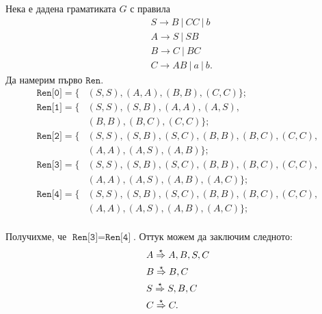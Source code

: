 \begin{extra}
\begin{multicols}{2}
    \begin{example}
      Нека е дадена граматиката $G$ с правила  
      \begin{align*}
        & S \to B\ |\ CC\ |\ b\\
        & A \to S\ |\ SB\\
        & B \to C\ |\ BC\\
        & C \to AB\ |\ a\ |\ b.
      \end{align*}
      Да намерим първо $\texttt{Ren}$.
      \begin{align*}
        \texttt{Ren[0]} = \{ & (S,S), (A,A), (B,B), (C,C)\};\\
        \texttt{Ren[1]} = \{ & (S,S), (S,B), (A,A), (A,S),\\
                             & (B,B), (B,C), (C,C)\};\\
        \texttt{Ren[2]} = \{ & (S,S),(S,B), (S,C), (B,B), (B,C), (C,C),\\
                             & (A,A), (A,S), (A,B)\};\\
        \texttt{Ren[3]} = \{ & (S,S),(S,B), (S,C), (B,B), (B,C), (C,C),\\
                             & (A,A), (A,S), (A,B), (A,C)\};\\
        \texttt{Ren[4]} = \{ & (S,S),(S,B), (S,C), (B,B), (B,C), (C,C),\\
                             & (A,A), (A,S), (A,B), (A,C)\};\\
      \end{align*}
      
      Получихме, че $\texttt{Ren[3]} = \texttt{Ren[4]}$.
      Оттук можем да заключим следното:
      \begin{align*}
        & A \stackrel{{\star}}{\Rightarrow} A,B,S,C\\
        & B \stackrel{{\star}}{\Rightarrow} B,C\\
        & S \stackrel{{\star}}{\Rightarrow} S,B,C\\
        & C \stackrel{{\star}}{\Rightarrow} C.          
      \end{align*}
      

\end{example}
\end{multicols}
\end{extra}
